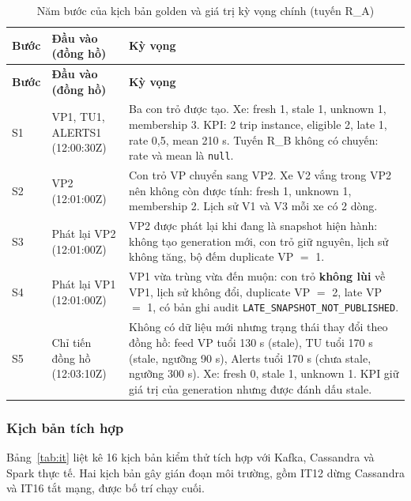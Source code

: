 \begin{longtable}{p{1.06cm}p{3.85cm}p{10.22cm}}
\caption{Năm bước của kịch bản golden và giá trị kỳ vọng chính (tuyến R\_A)} \label{tab:golden} \\
\toprule
\textbf{Bước} & \textbf{Đầu vào (đồng hồ)} & \textbf{Kỳ vọng} \\
\midrule
\endfirsthead
\toprule
\textbf{Bước} & \textbf{Đầu vào (đồng hồ)} & \textbf{Kỳ vọng} \\
\midrule
\endhead
{\tablefont S1} & {\tablefont VP1, TU1, ALERTS1 (12:00:30Z)} & {\tablefont Ba con trỏ được tạo. Xe: fresh 1, stale 1, unknown 1, membership 3. KPI: 2 trip instance, eligible 2, late 1, rate 0,5, mean 210 s. Tuyến R\_B không có chuyến: rate và mean là \texttt{null}.} \\
{\tablefont S2} & {\tablefont VP2 (12:01:00Z)} & {\tablefont Con trỏ VP chuyển sang VP2. Xe V2 vắng trong VP2 nên không còn được tính: fresh 1, unknown 1, membership 2. Lịch sử V1 và V3 mỗi xe có 2 dòng.} \\
{\tablefont S3} & {\tablefont Phát lại VP2 (12:01:00Z)} & {\tablefont VP2 được phát lại khi đang là snapshot hiện hành: không tạo generation mới, con trỏ giữ nguyên, lịch sử không tăng, bộ đếm duplicate VP $=$ 1.} \\
{\tablefont S4} & {\tablefont Phát lại VP1 (12:01:00Z)} & {\tablefont VP1 vừa trùng vừa đến muộn: con trỏ \textbf{không lùi} về VP1, lịch sử không đổi, duplicate VP $=$ 2, late VP $=$ 1, có bản ghi audit \texttt{LATE\_SNAPSHOT\_NOT\_PUBLISHED}.} \\
{\tablefont S5} & {\tablefont Chỉ tiến đồng hồ (12:03:10Z)} & {\tablefont Không có dữ liệu mới nhưng trạng thái thay đổi theo đồng hồ: feed VP tuổi 130 s (stale), TU tuổi 170 s (stale, ngưỡng 90 s), Alerts tuổi 170 s (chưa stale, ngưỡng 300 s). Xe: fresh 0, stale 1, unknown 1. KPI giữ giá trị của generation nhưng được đánh dấu stale.} \\
\bottomrule
\end{longtable}

\subsubsection{Kịch bản tích hợp}

Bảng~\ref{tab:it} liệt kê 16 kịch bản kiểm thử tích hợp với Kafka, Cassandra và Spark thực tế. Hai kịch bản gây gián đoạn môi trường, gồm IT12 dừng Cassandra và IT16 tắt mạng, được bố trí chạy cuối.

